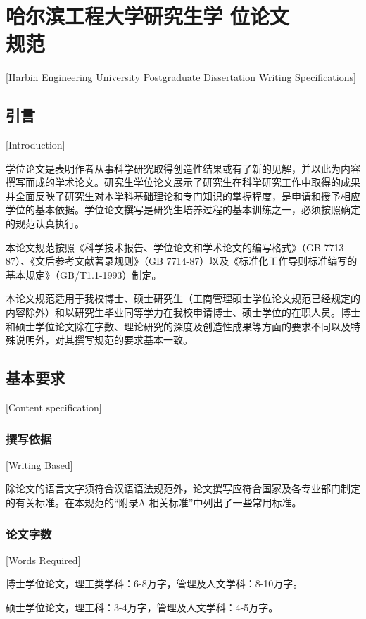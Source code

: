 
\chapter[哈尔滨工程大学研究生学位论文规范]{哈尔滨工程大学研究生学
  位论文\protect\\规范}[Harbin Engineering University Postgraduate Dissertation Writing Specifications]

\section{引言}[Introduction]

学位论文是表明作者从事科学研究取得创造性结果或有了新的见解，并以此为内容撰写而成的学术论文。研究生学位论文展示了研究生在科学研究工作中取得的成果并全面反映了研究生对本学科基础理论和专门知识的掌握程度，是申请和授予相应学位的基本依据。学位论文撰写是研究生培养过程的基本训练之一，必须按照确定的规范认真执行。

本论文规范按照《科学技术报告、学位论文和学术论文的编写格式》（GB 7713-87）、《文后参考文献著录规则》（GB 7714-87）以及《标准化工作导则标准编写的基本规定》（GB/T1.1-1993）制定。

本论文规范适用于我校博士、硕士研究生（工商管理硕士学位论文规范已经规定的内容除外）和以研究生毕业同等学力在我校申请博士、硕士学位的在职人员。博士和硕士学位论文除在字数、理论研究的深度及创造性成果等方面的要求不同以及特殊说明外，对其撰写规范的要求基本一致。


\section{基本要求}[Content specification]

\subsection{撰写依据}[Writing Based]

除论文的语言文字须符合汉语语法规范外，论文撰写应符合国家及各专业部门制定的有关标准。在本规范的“附录A 相关标准”中列出了一些常用标准。

\subsection{论文字数}[Words Required]

博士学位论文，理工类学科：6-8万字，管理及人文学科：8-10万字。

硕士学位论文，理工科：3-4万字，管理及人文学科：4-5万字。

